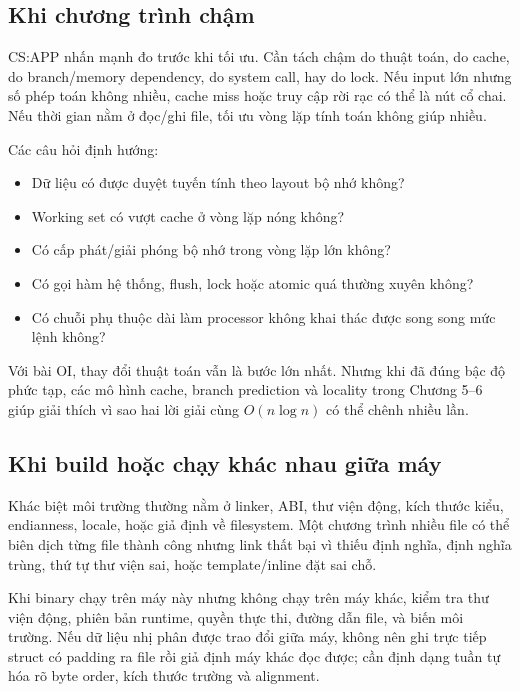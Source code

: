 \documentclass[11pt]{article}
\begin{document}
\subsection{Khi chương trình chậm}

CS:APP nhấn mạnh đo trước khi tối ưu. Cần tách chậm do thuật toán, do cache, do
branch/memory dependency, do system call, hay do lock. Nếu input lớn nhưng số
phép toán không nhiều, cache miss hoặc truy cập rời rạc có thể là nút cổ chai.
Nếu thời gian nằm ở đọc/ghi file, tối ưu vòng lặp tính toán không giúp nhiều.

Các câu hỏi định hướng:
\begin{itemize}
  \item Dữ liệu có được duyệt tuyến tính theo layout bộ nhớ không?
  \item Working set có vượt cache ở vòng lặp nóng không?
  \item Có cấp phát/giải phóng bộ nhớ trong vòng lặp lớn không?
  \item Có gọi hàm hệ thống, flush, lock hoặc atomic quá thường xuyên không?
  \item Có chuỗi phụ thuộc dài làm processor không khai thác được song song mức
        lệnh không?
\end{itemize}

Với bài OI, thay đổi thuật toán vẫn là bước lớn nhất. Nhưng khi đã đúng bậc độ
phức tạp, các mô hình cache, branch prediction và locality trong Chương 5--6
giúp giải thích vì sao hai lời giải cùng \(O(n\log n)\) có thể chênh nhiều lần.

\subsection{Khi build hoặc chạy khác nhau giữa máy}

Khác biệt môi trường thường nằm ở linker, ABI, thư viện động, kích thước kiểu,
endianness, locale, hoặc giả định về filesystem. Một chương trình nhiều file có
thể biên dịch từng file thành công nhưng link thất bại vì thiếu định nghĩa, định
nghĩa trùng, thứ tự thư viện sai, hoặc template/inline đặt sai chỗ.

Khi binary chạy trên máy này nhưng không chạy trên máy khác, kiểm tra thư viện
động, phiên bản runtime, quyền thực thi, đường dẫn file, và biến môi trường. Nếu
dữ liệu nhị phân được trao đổi giữa máy, không nên ghi trực tiếp struct có
padding ra file rồi giả định máy khác đọc được; cần định dạng tuần tự hóa rõ
byte order, kích thước trường và alignment.
\end{document}
